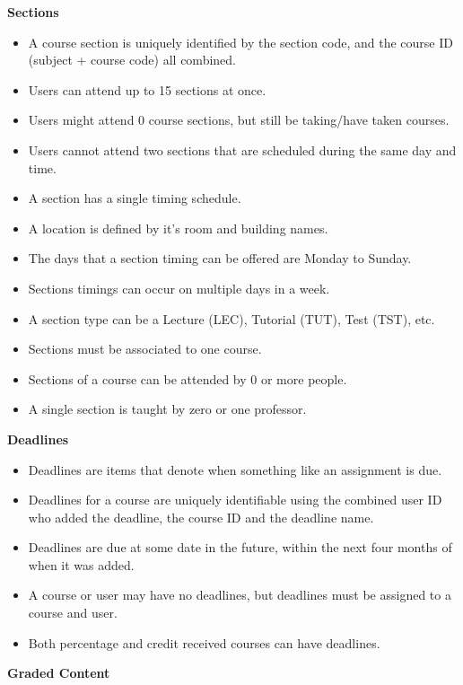 \documentclass[12pt, a4paper]{article}
\begin{document}
\textbf{Sections}
\begin{itemize}
    \item A course section is uniquely identified by the section code, and the course ID (subject + course code) all combined.
    \item Users can attend up to 15 sections at once.
    \item Users might attend 0 course sections, but still be taking/have taken courses.
    \item Users cannot attend two sections that are scheduled during the same day and time.
    \item A section has a single timing schedule.
    \item A location is defined by it's room and building names.
    \item The days that a section timing can be offered are Monday to Sunday.
    \item Sections timings can occur on multiple days in a week.
    \item A section type can be a Lecture (LEC), Tutorial (TUT), Test (TST), etc.
    \item Sections must be associated to one course.
    \item Sections of a course can be attended by 0 or more people.
    \item A single section is taught by zero or one professor.
\end{itemize}
\textbf{Deadlines}
\begin{itemize}
    \item Deadlines are items that denote when something like an assignment is due.
    \item Deadlines for a course are uniquely identifiable using the combined user ID who added the deadline, the course ID and the deadline name.
    \item Deadlines are due at some date in the future, within the next four months of when it was added.
    \item A course or user may have no deadlines, but deadlines must be assigned to a course and user.
    \item Both percentage and credit received courses can have deadlines.
\end{itemize}
\textbf{Graded Content}
\end{document}
